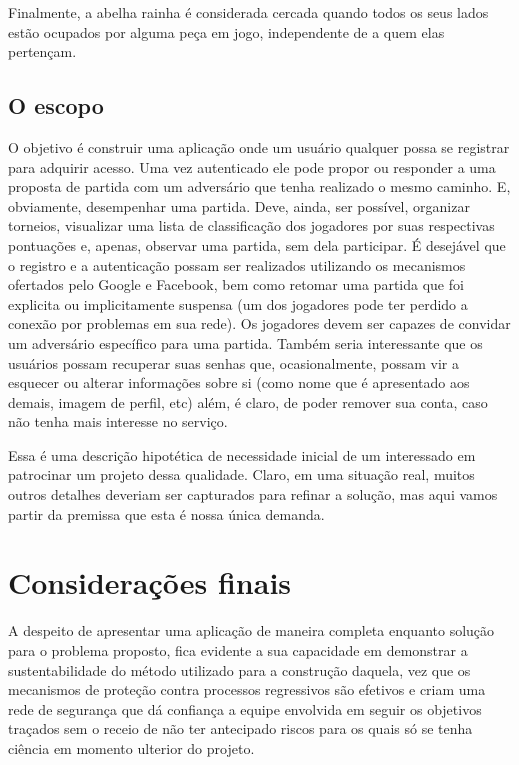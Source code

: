       Finalmente, a abelha rainha é considerada cercada quando todos os seus lados estão ocupados por alguma peça em jogo, independente de a quem elas pertençam.

    \subsection{O escopo}

      O objetivo é construir uma aplicação onde um usuário qualquer possa se registrar para adquirir acesso. Uma vez autenticado ele pode propor ou responder a uma proposta de partida com um adversário que tenha realizado o mesmo caminho. E, obviamente, desempenhar uma partida. Deve, ainda, ser possível, organizar torneios, visualizar uma lista de classificação dos jogadores por suas respectivas pontuações e, apenas, observar uma partida, sem dela participar. É desejável que o registro e a autenticação possam ser realizados utilizando os mecanismos ofertados pelo Google e Facebook, bem como retomar uma partida que foi explicita ou implicitamente suspensa (um dos jogadores pode ter perdido a conexão por problemas em sua rede). Os jogadores devem ser capazes de convidar um adversário específico para uma partida. Também seria interessante que os usuários possam recuperar suas senhas que, ocasionalmente, possam vir a esquecer ou alterar informações sobre si (como nome que é apresentado aos demais, imagem de perfil, etc) além, é claro, de poder remover sua conta, caso não tenha mais interesse no serviço.

      Essa é uma descrição hipotética de necessidade inicial de um interessado em patrocinar um projeto dessa qualidade. Claro, em uma situação real, muitos outros detalhes deveriam ser capturados para refinar a solução, mas aqui vamos partir da premissa que esta é nossa única demanda.

    

  \section{Considerações finais}

    A despeito de apresentar uma aplicação de maneira completa enquanto solução para o problema proposto, fica evidente a sua capacidade em demonstrar a sustentabilidade do método utilizado para a construção daquela, vez que os mecanismos de proteção contra processos regressivos são efetivos e criam uma rede de segurança que dá confiança a equipe envolvida em seguir os objetivos traçados sem o receio de não ter antecipado riscos para os quais só se tenha ciência em momento ulterior do projeto.

